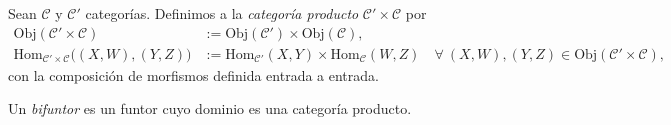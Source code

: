 \documentclass[tesis]{subfiles}
\begin{document}
\begin{Def}\label{Def: Categoría producto}
    Sean $\mathscr{C}$ y $\mathscr{C}'$ categorías. Definimos a la \emph{categoría producto} $\mathscr{C}'\times \mathscr{C}$ por
    \begin{align*}
        \text{Obj}(\mathscr{C}'\times \mathscr{C}) &:= \text{Obj}(\mathscr{C}')\times \text{Obj}(\mathscr{C}), \\
        \text{Hom}_{\mathscr{C}'\times\mathscr{C}}\big( (X,W), (Y,Z) \big) &:= \text{Hom}_{\mathscr{C}'}(X,Y)\times\text{Hom}_\mathscr{C}(W,Z) \quad \forall \ (X,W),(Y,Z)\in \text{Obj}(\mathscr{C}'\times\mathscr{C}),
    \end{align*}
    con la composición de morfismos definida entrada a entrada.
\end{Def}

\begin{Def}\label{Def: Bifuntor}
    Un \emph{bifuntor} es un funtor cuyo dominio es una categoría producto.
\end{Def}

%
%
%
\end{document}

